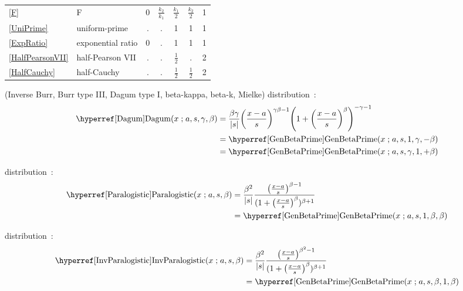 \begin{table*}[tp]
\begin{center}
{\begin{tabular}{llccccc}
\eqref{F} & F	&  0 &  $\tfrac{k_2}{k_1}$ & $\tfrac{k_1}{2}$ & $\tfrac{k_2}{2}$   &    1     \\
\eqref{UniPrime} & uniform-prime	& . & . & 1 & 1 & 1  \\
\eqref{ExpRatio} & exponential ratio		& 0 & . & 1 & 1 & 1  \\
\eqref{HalfPearsonVII} & half-Pearson  VII	&  . &  .  &   $\tfrac{1}{2}$ & .   &    2     \\
\eqref{HalfCauchy} & half-Cauchy	&  . &  . & $\tfrac{1}{2}$ & $\tfrac{1}{2}$   &    2     \\
\end{tabular} 
}
\end{center}
\end{table*}




\pagebreak
{} (Inverse Burr, Burr type III, Dagum type I,  beta-kappa, beta-k, Mielke) distribution~\cite{Burr1942, Dagum1977, Tadikamalla1980}:
\begin{align}
\label{Dagum}
\opr{Dagum}(x \given a, s, \gamma, \beta)
&=  \frac{\beta \gamma}{|s|} \Left(\frac{x-a}{s}\Right)^{\gamma \beta-1}  \Left(1+\Left(\frac{x-a}{s}\Right)^\beta\Right)^{-\gamma-1} 
\checked
\\ \notag &= \opr{GenBetaPrime}(x\given a, s, 1, \gamma,-\beta) \checked
\\ \notag &= \opr{GenBetaPrime}(x\given a, s, \gamma,1,+\beta) \checked
\end{align}

 distribution~\cite{Kleiber2003}:
\begin{align}
\label{Paralogistic}
\opr{Paralogistic}(x\given a, s, \beta) &= \frac{\beta^2}{|s|} \frac{ \Left(\frac{x-a}{s}\Right)^{\beta-1}}{ (1+ \Left(\frac{x-a}{s}\Right)^\beta)^{\beta+1} } \checked
\\ \notag &= \opr{GenBetaPrime}(x\given a, s, 1,\beta,\beta)
\checked
\end{align}


 distribution~\cite{Klugman2012}:
\begin{align}
\label{InvParalogistic}
\opr{InvParalogistic}(x\given a,s,\beta) &= \frac{\beta^2}{|s|}  \frac{ \Left(\frac{x-a}{s}\Right)^{\beta^2-1}}{ (1+ \Left(\frac{x-a}{s}\Right)^\beta)^{\beta+1} } \checked
\\ \notag &= \opr{GenBetaPrime}(x\given a, s, \beta,1,\beta) \checked
\end{align}





